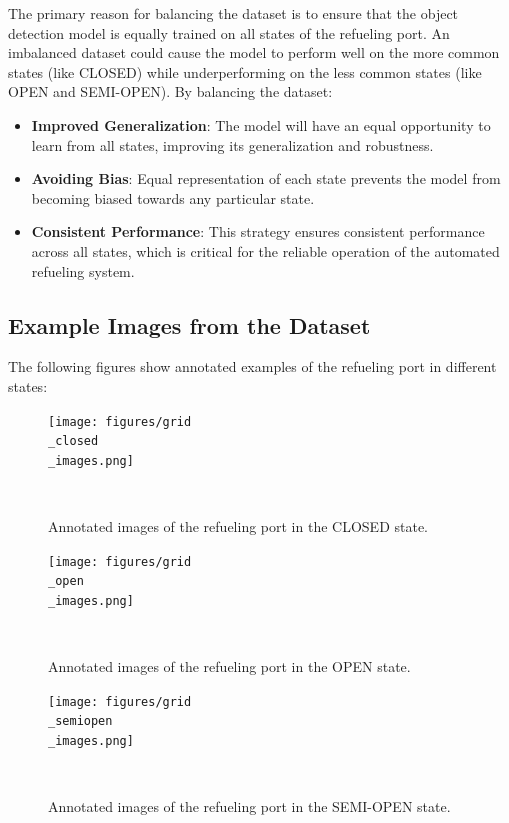 \documentclass[12pt,oneside]{book} %
\begin{document}
The primary reason for balancing the dataset is to ensure that the object
detection model is equally trained on all states of the refueling port. An
imbalanced dataset could cause the model to perform well on the more common
states (like CLOSED) while underperforming on the less common states (like OPEN
and SEMI-OPEN). By balancing the dataset:

\begin{itemize}
    \item \textbf{Improved Generalization}: The model will have an equal opportunity to learn from all states, improving its generalization and robustness.
    \item \textbf{Avoiding Bias}: Equal representation of each state prevents the model from becoming biased towards any particular state.
    \item \textbf{Consistent Performance}: This strategy ensures consistent performance across all states, which is critical for the reliable operation of the automated refueling system.
\end{itemize}

\subsection{Example Images from the Dataset}
The following figures show annotated examples of the refueling port in
different states:
\begin{figure}[H]
    \centering
    \texttt{[image: figures/grid\\\_closed\\\_images.png]}
    \caption{Annotated images of the refueling port in the CLOSED state.}~\label{fig:grid-closed-images}
\end{figure}

\begin{figure}[H]
    \centering
    \texttt{[image: figures/grid\\\_open\\\_images.png]}
    \caption{Annotated images of the refueling port in the OPEN state.}~\label{fig:grid-open-images}
\end{figure}

\begin{figure}[H]
    \centering
    \texttt{[image: figures/grid\\\_semiopen\\\_images.png]}
    \caption{Annotated images of the refueling port in the SEMI-OPEN state.}~\label{fig:grid-semi-open-images}
\end{figure}
\end{document}
